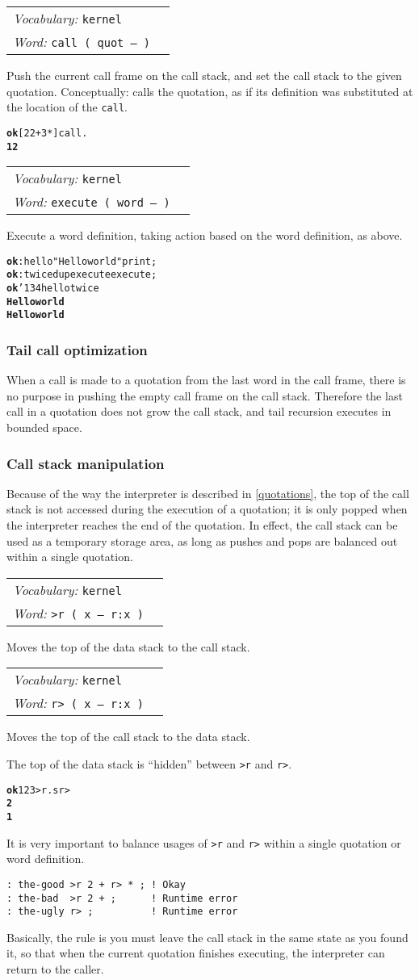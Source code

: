 \documentclass{book}
\newcommand{\bs}{\char'134}
\newcommand{\vocabulary}[1]{\emph{Vocabulary:} \texttt{#1}&\\}
\newcommand{\ordinaryword}[2]{\index{\texttt{#1}}\emph{Word:} \texttt{#2}&\\}
\newcommand{\wordtable}[1]{


\begin{tabularx}{12cm}{lX}
\hline
#1
\hline
\end{tabularx}

}
\begin{document}
\wordtable{
\vocabulary{kernel}
\ordinaryword{call}{call ( quot -- )}
}
Push the current call frame on the call stack, and set the call stack to the given quotation. Conceptually: calls the quotation, as if its definition was substituted at the location of the \texttt{call}.
\begin{alltt}
\textbf{ok} [ 2 2 + 3 * ] call .
\textbf{12}
\end{alltt}
\wordtable{
\vocabulary{kernel}
\ordinaryword{execute}{execute ( word -- )}
}
Execute a word definition, taking action based on the word definition, as above.
\begin{alltt}
\textbf{ok} : hello "Hello world" print ;
\textbf{ok} : twice dup execute execute ;
\textbf{ok} \bs hello twice
\textbf{Hello world}
\textbf{Hello world}
\end{alltt}

\subsubsection{Tail call optimization}

\newcommand{\tailglos}{\glossary{
name=tail call,
description=the last call in a quotation}
\glossary{
name=tail call optimization,
description=the elimination of call stack pushes when making a tail call}}

When a call is made to a quotation from the last word in the call frame, there is no
purpose in pushing the empty call frame on the call stack. Therefore the last call in a quotation does not grow the call stack, and tail recursion executes in bounded space.

\subsubsection{Call stack manipulation}

Because of the way the interpreter is described in \ref{quotations}, the top of the call stack is not accessed during the execution of a quotation; it is only popped when the interpreter reaches the end of the quotation. In effect, the call stack can be used as a temporary storage area, as long as pushes and pops are balanced out within a single quotation.
\wordtable{
\vocabulary{kernel}
\ordinaryword{>r}{>r ( x -- r:x )}
}
Moves the top of the data stack to the call stack.
\wordtable{
\vocabulary{kernel}
\ordinaryword{r>}{r> ( x -- r:x )}
}
Moves the top of the call stack to the data stack.

The top of the data stack is ``hidden'' between \texttt{>r} and \texttt{r>}.
\begin{alltt}
\textbf{ok} 1 2 3 >r .s r>
\textbf{2
1}
\end{alltt}
It is very important to balance usages of \texttt{>r} and \texttt{r>} within a single quotation or word definition.
\begin{verbatim}
: the-good >r 2 + r> * ; ! Okay
: the-bad  >r 2 + ;      ! Runtime error
: the-ugly r> ;          ! Runtime error
\end{verbatim}
Basically, the rule is you must leave the call stack in the same state as you found it, so that when the current quotation finishes executing, the interpreter can return to the caller.
\end{document}
